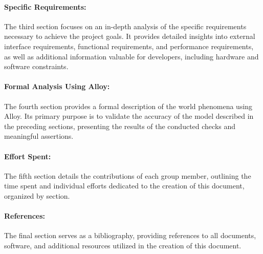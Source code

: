 \paragraph{Specific Requirements:} The third section focuses on an in-depth analysis of the specific requirements necessary to achieve the project goals. It provides detailed insights into external interface requirements, functional requirements, and performance requirements, as well as additional information valuable for developers, including hardware and software constraints.
\paragraph{Formal Analysis Using Alloy:} The fourth section provides a formal description of the world phenomena using Alloy. Its primary purpose is to validate the accuracy of the model described in the preceding sections, presenting the results of the conducted checks and meaningful assertions.
\paragraph{Effort Spent:} The fifth section details the contributions of each group member, outlining the time spent and individual efforts dedicated to the creation of this document, organized by section.
\paragraph{References:} The final section serves as a bibliography, providing references to all documents, software, and additional resources utilized in the creation of this document.